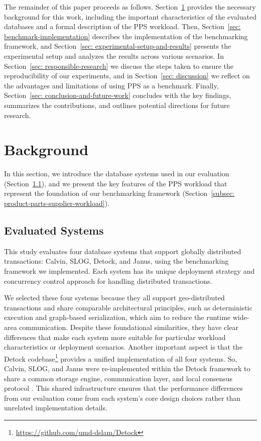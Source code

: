 \documentclass{article}
\begin{document}
The remainder of this paper proceeds as follows. Section~\ref{sec: background} provides the necessary background for this work, including the important characteristics of the evaluated databases and a formal description of the PPS workload. Then, Section~\ref{sec: benchmark-implementation} describes the implementation of the benchmarking framework, and Section~\ref{sec: experimental-setup-and-results} presents the experimental setup and analyzes the results across various scenarios. In Section~\ref{sec: responsible-research} we discuss the steps taken to ensure the reproducibility of our experiments, and in Section~\ref{sec: discussion} we reflect on the advantages and limitations of using PPS as a benchmark. Finally, Section~\ref{sec: conclusion-and-future-work} concludes with the key findings, summarizes the contributions, and outlines potential directions for future research.

\section{Background}
\label{sec: background}
In this section, we introduce the database systems used in our evaluation (Section~\ref{subsec: evaluated-systems}), and we present the key features of the PPS workload that represent the foundation of our benchmarking framework (Section~\ref{subsec: product-parts-supplier-workload}).

\subsection{Evaluated Systems}
\label{subsec: evaluated-systems}
This study evaluates four database systems that support globally distributed transactions: Calvin, SLOG, Detock, and Janus, using the benchmarking framework we implemented. Each system has its unique deployment strategy and concurrency control approach for handling distributed transactions.

We selected these four systems because they all support geo-distributed transactions and share comparable architectural principles, such as deterministic execution and graph-based serialization, which aim to reduce the runtime wide-area communication. Despite these foundational similarities, they have clear differences that make each system more suitable for particular workload characteristics or deployment scenarios. Another important aspect is that the Detock codebase\footnote{\url{https://github.com/umd-dslam/Detock}} provides a unified implementation of all four systems. So, Calvin, SLOG, and Janus were re-implemented within the Detock framework to share a common storage engine, communication layer, and local consensus protocol \cite{nguyen2023detock}. This shared infrastructure ensures that the performance differences from our evaluation come from each system's core design choices rather than unrelated implementation details.
\end{document}
